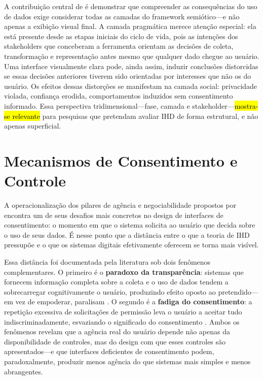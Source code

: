 \documentclass[
	12pt,				%
	oneside,			%
	a4paper,			%
	english,			%
	brazil				%
	]{abntex2ppgsi}
\begin{document}
    A contribuição central de  é demonstrar que compreender as consequências do uso de dados exige considerar todas as camadas do framework semiótico---e não apenas a exibição visual final. A camada pragmática merece atenção especial: ela está presente desde as etapas iniciais do ciclo de vida, pois as intenções dos stakeholders que conceberam a ferramenta orientam as decisões de coleta, transformação e representação antes mesmo que qualquer dado chegue ao usuário. Uma interface visualmente clara pode, ainda assim, induzir conclusões distorcidas se essas decisões anteriores tiverem sido orientadas por interesses que não os do usuário. Os efeitos dessas distorções se manifestam na camada social: privacidade violada, confiança erodida, comportamentos induzidos sem consentimento informado. Essa perspectiva tridimensional---fase, camada e stakeholder---\hl{mostra-se relevante} para pesquisas que pretendam avaliar IHD de forma estrutural, e não apenas superficial.

    \section{Mecanismos de Consentimento e Controle}

    A operacionalização dos pilares de agência e negociabilidade propostos por  encontra um de seus desafios mais concretos no design de interfaces de consentimento: o momento em que o sistema solicita ao usuário que decida sobre o uso de seus dados. É nesse ponto que a distância entre o que a teoria de IHD pressupõe e o que os sistemas digitais efetivamente oferecem se torna mais visível.

    Essa distância foi documentada pela literatura sob dois fenômenos complementares. O primeiro é o \textbf{paradoxo da transparência}: sistemas que fornecem informação completa sobre a coleta e o uso de dados tendem a sobrecarregar cognitivamente o usuário, produzindo efeito oposto ao pretendido---em vez de empoderar, paralisam \cite{chalhoub2024useful, angelopoulos2021stewardship}. O segundo é a \textbf{fadiga do consentimento}: a repetição excessiva de solicitações de permissão leva o usuário a aceitar tudo indiscriminadamente, esvaziando o significado do consentimento \cite{cezar2023cognitive, Hutton2017}. Ambos os fenômenos revelam que a agência real do usuário depende não apenas da disponibilidade de controles, mas do design com que esses controles são apresentados---e que interfaces deficientes de consentimento podem, paradoxalmente, produzir menos agência do que sistemas mais simples e menos abrangentes.
\end{document}
